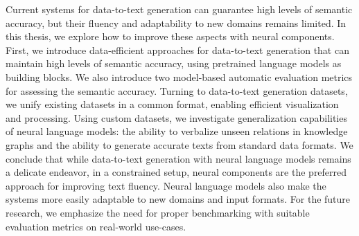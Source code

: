Current systems for data-to-text generation can guarantee high levels of semantic accuracy, but their fluency and adaptability to new domains remains limited. In this thesis, we explore how to improve these aspects with neural components. First, we introduce data-efficient approaches for data-to-text generation that can maintain high levels of semantic accuracy, using pretrained language models as building blocks. We also introduce two model-based automatic evaluation metrics for assessing the semantic accuracy. Turning to data-to-text generation datasets, we unify existing datasets in a common format, enabling efficient visualization and processing. Using custom datasets, we investigate generalization capabilities of neural language models: the ability to verbalize unseen relations in knowledge graphs and the ability to generate accurate texts from standard data formats. We conclude that while data-to-text generation with neural language models remains a delicate endeavor, in a constrained setup, neural components are the preferred approach for improving text fluency. Neural language models also make the systems more easily adaptable to new domains and input formats. For the future research, we emphasize the need for proper benchmarking with suitable evaluation metrics on real-world use-cases.
